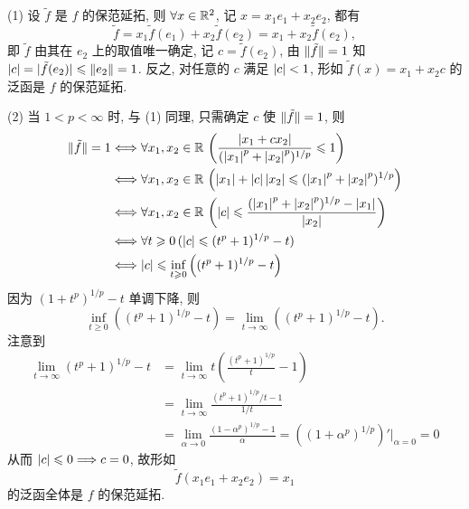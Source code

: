     \begin{Proof}
        (1) 设 $ \tilde{f} $ 是 $ f $ 的保范延拓, 则 $ \forall x\in\mathbb{R}^{2} $, 记 $ x=x_{1}e_{1}+x_{2}e_{2} $, 都有
        \[
            \tilde{f} = x_{1}\tilde{f}(e_{1})+x_{2}\tilde{f}(e_{2})=x_{1}+x_{2}\tilde{f}(e_{2}),
        \]
        即 $ \tilde{f} $ 由其在 $ e_{2} $ 上的取值唯一确定, 记 $ c=\tilde{f}(e_{2}) $, 由 $ \lVert \tilde{f}\rVert=1 $ 知 $ \left| c \right| =\lvert \tilde{f}(e_{2})\rvert\leqslant\left\| e_{2} \right\|=1 $. 反之, 对任意的 $ c $ 满足 $ \left| c \right| <1 $, 形如 $ \tilde{f}(x)=x_{1}+x_{2}c $ 的泛函是 $ f $ 的保范延拓.

        (2) 当 $ 1<p<\infty $ 时, 与 (1) 同理, 只需确定 $ c $ 使 $ \lVert \tilde{f}\rVert=1 $, 则
        \[
            \begin{aligned}
                \lVert \tilde{f}\rVert=1 & \Longleftrightarrow \forall x_{1}, x_{2}\in\mathbb{R}\,\left( \frac{\left| x_{1}+cx_{2} \right| }{(\left| x_{1} \right| ^{p}+\left| x_{2} \right| ^{p})^{1/p}}\leqslant1 \right)\\
                & \Longleftrightarrow\forall x_{1}, x_{2}\in\mathbb{R}\,\left(\left| x_{1} \right| +\left| c \right| \left| x_{2} \right| \leqslant(\left| x_{1} \right| ^{p}+\left| x_{2} \right| ^{p})^{1/p} \right)\\
                & \Longleftrightarrow \forall x_{1}, x_{2}\in\mathbb{R}\,\left( \left| c \right| \leqslant\frac{(\left| x_{1} \right| ^{p}+\left| x_{2} \right| ^{p})^{1/p}-\left| x_{1} \right| }{\left| x_{2} \right| } \right)\\
                & \Longleftrightarrow \forall t\geqslant0\,(\left| c \right| \leqslant(t^{p}+1)^{1/p}-t)\\
                &\Longleftrightarrow \left| c \right| \leqslant\inf_{t\geqslant0}\left( (t^{p}+1)^{1/p}-t \right)
            \end{aligned}
        \]
        因为 $ (1+t^{p})^{1/p}-t $ 单调下降, 则
        \[
            \inf_{t\geqslant0}\left( (t^{p}+1)^{1/p}-t \right)=\lim_{t\to\infty}\left( (t^{p}+1)^{1/p}-t \right).
        \]
        注意到
        \[
            \begin{aligned}
                \lim_{t\to\infty}(t^{p}+1)^{1/p}-t & =\lim_{t\to\infty}t\left( \frac{(t^{p}+1)^{1/p}}{t}-1 \right)\\
                & = \lim_{t\to\infty}\frac{(t^{p}+1)^{1/p}/t-1}{1/t}\\
                & = \lim_{\alpha\to0}\frac{(1-\alpha^{p})^{1/p}-1}{\alpha}=\left( (1+\alpha^{p})^{1/p} \right)'\Big|_{\alpha=0}=0
            \end{aligned}
        \]
        从而 $ \left| c \right| \leqslant0\Longrightarrow c=0 $, 故形如 
        \[
            \tilde{f}(x_{1}e_{1}+x_{2}e_{2})=x_{1}
        \]
        的泛函全体是 $ f $ 的保范延拓.


\end{Proof}
